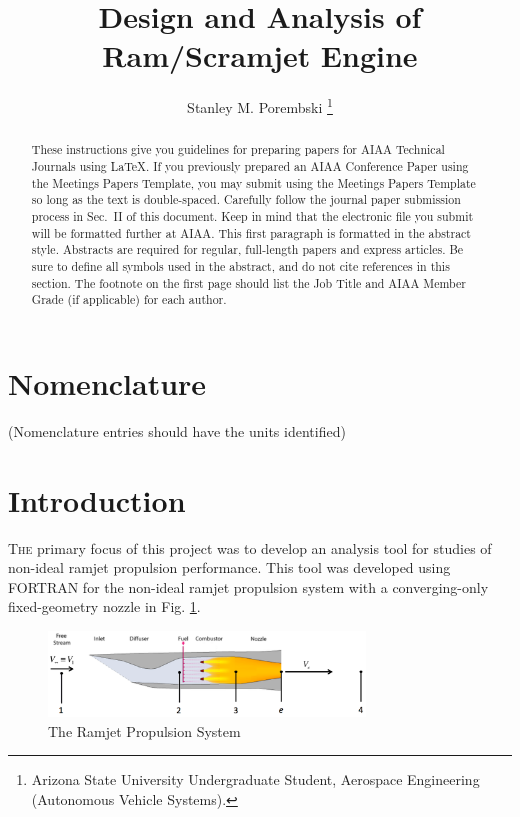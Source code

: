 \documentclass[conf]{new-aiaa} %
\title{Design and Analysis of Ram/Scramjet Engine}
\author{Stanley M. Porembski \footnote{Arizona State University Undergraduate Student, Aerospace Engineering (Autonomous Vehicle Systems).}}
\affil{Arizona State University Ira A. Schools of Engineering, Tempe, AZ, 85281}
\begin{document}
\maketitle

\begin{abstract}
These instructions give you guidelines for preparing papers for AIAA Technical Journals using \LaTeX{}. If you previously prepared an AIAA Conference Paper using the Meetings Papers Template, you may submit using the Meetings Papers Template so long as the text is double-spaced.  Carefully follow the journal paper submission process in Sec.~II of this document. Keep in mind that the electronic file you submit will be formatted further at AIAA. This first paragraph is formatted in the abstract style. Abstracts are required for regular, full-length papers and express articles. Be sure to define all symbols used in the abstract, and do not cite references in this section. The footnote on the first page should list the Job Title and AIAA Member Grade (if applicable) for each author.
\end{abstract}


\section*{Nomenclature}

\noindent(Nomenclature entries should have the units identified)




\section{Introduction}
\lettrine{T}{he} primary focus of this project was to develop an analysis tool for studies of non-ideal ramjet propulsion performance. This tool was developed using FORTRAN for the non-ideal ramjet propulsion system with a converging-only fixed-geometry nozzle in Fig. \ref{fig:propsys}.

\begin{figure}[hbt!]
\centering
\includegraphics[width=0.75\textwidth]{media/the_ramjet.png}
\caption{\label{fig:propsys} The Ramjet Propulsion System}
\end{figure}
\end{document}
